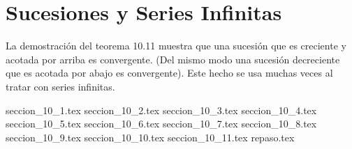 
\chapter{Sucesiones y Series Infinitas}

La demostración del teorema 10.11 muestra que una sucesión que es creciente y acotada por arriba es convergente. (Del mismo modo una sucesión decreciente que es acotada por abajo es convergente). Este hecho se usa muchas veces al tratar con series infinitas.

{seccion_10_1.tex}
{seccion_10_2.tex}
{seccion_10_3.tex}
{seccion_10_4.tex}
{seccion_10_5.tex}
{seccion_10_6.tex}
{seccion_10_7.tex}
{seccion_10_8.tex}
{seccion_10_9.tex}
{seccion_10_10.tex}
{seccion_10_11.tex}
{repaso.tex}









